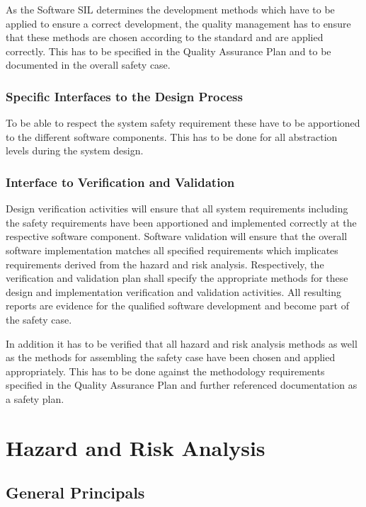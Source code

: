 \documentclass{template/openetcs_report}
\begin{document}
As the Software SIL determines the development methods which have to be applied to ensure a correct development, the quality management has to ensure that these methods are chosen according to the standard and are applied correctly. This has to be specified in the Quality Assurance Plan and to be documented in the overall safety case. 

\subsection{Specific Interfaces to the Design Process}

To be able to respect the system safety requirement these have to be apportioned to the different software components. This has to be done for all abstraction levels during the system design. 

\subsection{Interface to Verification and Validation}

Design verification activities will ensure that all system requirements including the safety requirements have been apportioned and implemented correctly at the respective software component. Software validation will ensure that the overall software implementation matches all specified requirements which implicates requirements derived from the hazard and risk analysis. Respectively, the verification and validation plan shall specify the appropriate methods for these design and implementation verification and validation activities. All resulting reports are evidence for the qualified software development and become part of the safety case.

In addition it has to be verified that all hazard and risk analysis methods as well as the methods for assembling the safety case have been chosen and applied appropriately. This has to be done against the methodology requirements specified in the Quality Assurance Plan and further referenced documentation as a safety plan.

\chapter{Hazard and Risk Analysis}
\label{sec:hazardandrisk}

\section{General Principals}
\end{document}
